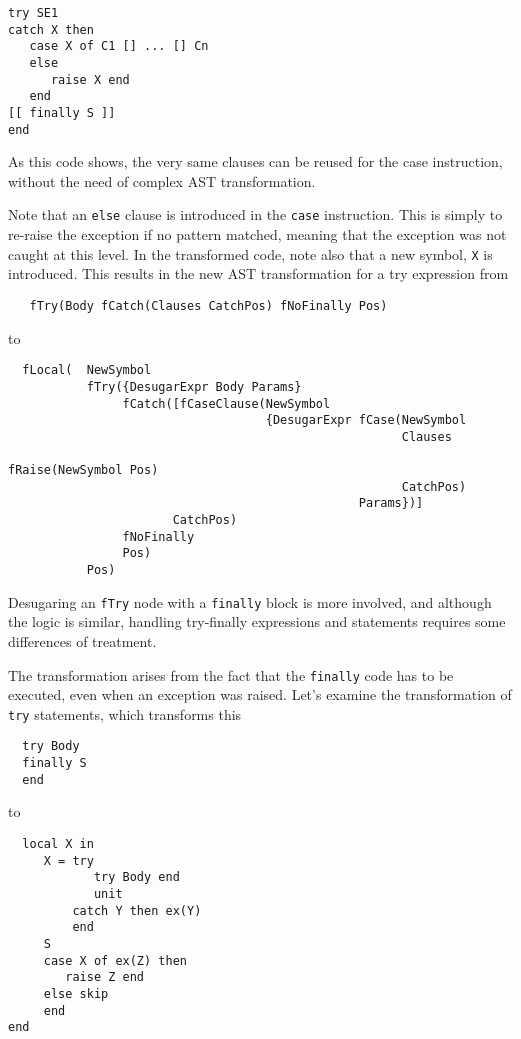 \documentclass[a4paper]{memoir}
\begin{document}
\begin{lstlisting}
try SE1 
catch X then 
   case X of C1 [] ... [] Cn 
   else 
      raise X end 
   end 
[[ finally S ]]
end
\end{lstlisting}

As this code shows, the very same clauses can be reused for the case
instruction, without the need of complex AST transformation.

Note that an \lstinline!else! clause is introduced in the \lstinline!case!
instruction. This is simply to re-raise the exception if no pattern matched,
meaning that the exception was not caught at this level.
In the transformed code, note also that a new symbol, \lstinline!X! is
introduced. This results in the new AST transformation for a try expression from
\begin{lstlisting}
   fTry(Body fCatch(Clauses CatchPos) fNoFinally Pos)
\end{lstlisting}
to
\begin{lstlisting}
  fLocal(  NewSymbol
           fTry({DesugarExpr Body Params} 
                fCatch([fCaseClause(NewSymbol 
                                    {DesugarExpr fCase(NewSymbol 
                                                       Clauses 
                                                       fRaise(NewSymbol Pos) 
                                                       CatchPos) 
                                                 Params})] 
                       CatchPos) 
                fNoFinally 
                Pos)
           Pos)
\end{lstlisting}

Desugaring an \lstinline!fTry! node with a \lstinline!finally! block is more
involved, and although the logic is similar, handling try-finally expressions and
statements requires some differences of treatment.

The transformation arises from the fact that the \lstinline!finally! code has to
be executed, even when an exception was raised.
Let's examine the transformation of \lstinline!try! statements, which
transforms this

\begin{lstlisting}
  try Body
  finally S 
  end
\end{lstlisting}

to

\begin{lstlisting}
  local X in 
     X = try 
            try Body end 
            unit 
         catch Y then ex(Y)
         end 
     S 
     case X of ex(Z) then 
        raise Z end 
     else skip 
     end 
end  
\end{lstlisting}
\end{document}
